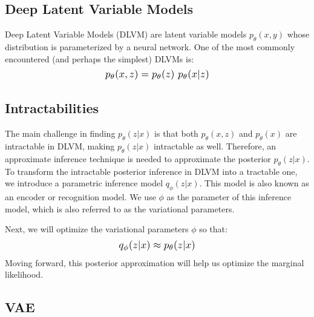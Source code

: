 \documentclass{article}
\newcommand*{\Scale}[2][4]{\scalebox{#1}{\ensuremath{#2}}}
\begin{document}
\subsection{Deep Latent Variable Models}


Deep Latent Variable Models (DLVM) are latent variable models $ p_\theta(x,y) $ whose distribution is parameterized by a neural network. One of the most commonly encountered (and perhaps the simplest) DLVMs is:
\begin{equation}
\Scale[1.2]{ p_\theta(x,z) = p_\theta(z) \ p_\theta(x|z) }
\end{equation}


\subsection{Intractabilities}


The main challenge in finding $ p_\theta(z|x) $ is that both $ p_\theta(x, z) $ and $ p_\theta(x) $ are intractable in DLVM, making $ p_\theta(z|x) $ intractable as well. Therefore, an approximate inference technique is needed to approximate the posterior $ p_\theta(z|x) $. To transform the intractable posterior inference in DLVM into a tractable one, we introduce a parametric inference model $ q_\phi(z|x) $. This model is also known as an encoder or recognition model. We use $ \phi $ as the parameter of this inference model, which is also referred to as the variational parameters. 

Next, we will optimize the variational parameters $ \phi $ so that:
\begin{equation}
\Scale[1.2]{ q_\phi(z|x) \approx p_\theta(z|x) }
\end{equation}
Moving forward, this posterior approximation will help us optimize the marginal likelihood.


\subsection{VAE}
\end{document}
